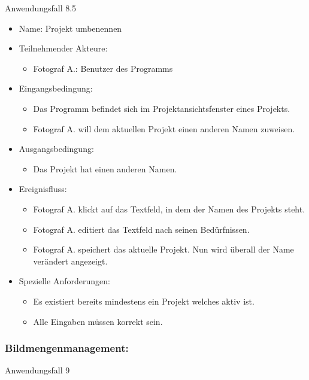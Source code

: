 	\begin{description}
\item[Anwendungsfall 8.5]
\end{description}
 
\begin{itemize}
\item Name: Projekt umbenennen
\item Teilnehmender Akteure:
\begin{itemize}
\item Fotograf A.: Benutzer des Programms
\end{itemize}
\item Eingangsbedingung:
\begin{itemize}
\item Das Programm befindet sich im Projektansichtsfenster eines Projekts.
\item Fotograf A. will dem aktuellen Projekt einen anderen Namen zuweisen.
\end{itemize}
\item Ausgangsbedingung:
\begin{itemize}
\item Das Projekt hat einen anderen Namen.
\end{itemize}
\item Ereignisfluss:
\begin{itemize}
\item Fotograf A. klickt auf das Textfeld, in dem der Namen des Projekts steht.
\item Fotograf A. editiert das Textfeld nach seinen Bedürfnissen.
\item Fotograf A. speichert das aktuelle Projekt. Nun wird überall der Name verändert angezeigt.
\end{itemize}
\item Spezielle Anforderungen:
\begin{itemize}
\item Es existiert bereits mindestens ein Projekt welches aktiv ist.
\item Alle Eingaben müssen korrekt sein.
\end{itemize}
\end{itemize}

	\subsubsection{Bildmengenmanagement:}
	
	\begin{description}
		\item[Anwendungsfall 9]
	\end{description}
	
